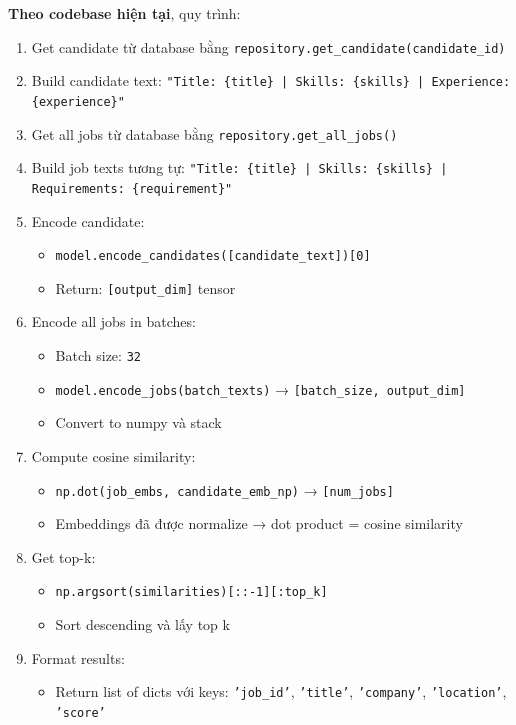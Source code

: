 \textbf{Theo codebase hiện tại}, quy trình:

\begin{enumerate}
    \item Get candidate từ database bằng \texttt{repository.get\_candidate(candidate\_id)}
    \item Build candidate text: \texttt{"Title: \{title\} | Skills: \{skills\} | Experience: \{experience\}"}
    \item Get all jobs từ database bằng \texttt{repository.get\_all\_jobs()}
    \item Build job texts tương tự: \texttt{"Title: \{title\} | Skills: \{skills\} | Requirements: \{requirement\}"}
    \item Encode candidate:
    \begin{itemize}
        \item \texttt{model.encode\_candidates([candidate\_text])[0]}
        \item Return: \texttt{[output\_dim]} tensor
    \end{itemize}
    \item Encode all jobs in batches:
    \begin{itemize}
        \item Batch size: \texttt{32}
        \item \texttt{model.encode\_jobs(batch\_texts)} → \texttt{[batch\_size, output\_dim]}
        \item Convert to numpy và stack
    \end{itemize}
    \item Compute cosine similarity:
    \begin{itemize}
        \item \texttt{np.dot(job\_embs, candidate\_emb\_np)} → \texttt{[num\_jobs]}
        \item Embeddings đã được normalize → dot product = cosine similarity
    \end{itemize}
    \item Get top-k:
    \begin{itemize}
        \item \texttt{np.argsort(similarities)[::-1][:top\_k]}
        \item Sort descending và lấy top k
    \end{itemize}
    \item Format results:
    \begin{itemize}
        \item Return list of dicts với keys: \texttt{'job\_id'}, \texttt{'title'}, \texttt{'company'}, \texttt{'location'}, \texttt{'score'}
    \end{itemize}
\end{enumerate}

